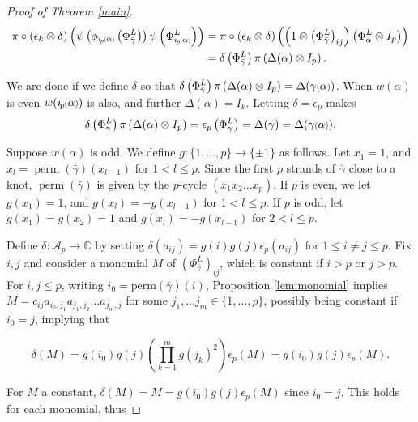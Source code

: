 \documentclass[11pt]{amsart}
\def\C{{\mathbb C}}
\def\A{{\mathcal A}}
\newcommand*{\smallp}[1]{\scalebox{.75}{\ensuremath#1}}
\newcommand*{\subsmallp}[1]{\scalebox{.5}{\ensuremath#1}}
\newcommand{\pp}[2][p]{\imath_{\hspace*{-1pt}#1}\hspace*{-.5pt}\smallp(#2\smallp)}
\newcommand{\subpp}[2][p]{\imath_{\hspace*{-1pt}#1}\hspace*{-.5pt}\subsmallp(#2\subsmallp)}
\newcommand\perm{\operatorname{perm}}
\theoremstyle{definition}
\begin{document}
\begin{proof}[Proof of Theorem \ref{main}]
\begin{align*}
\pi\circ(\epsilon_k\otimes\delta)\left(\psi\left(\phi_{\subpp\alpha}\left(\Phi_{\bar\gamma}^L\right)\right)\psi\left(\Phi_{\subpp\alpha}^L\right)\right)
    & = \pi\circ(\epsilon_k\otimes\delta)\left(\left(1\otimes \left(\Phi_{\bar\gamma}^L\right)_{ij}\right)\left(\Phi_\alpha^L\otimes I_p\right)\right)\\
    & = \delta\left(\Phi_{\bar\gamma}^L\right)\pi\left(\Delta(\alpha)\otimes I_p\right).
\end{align*}

We are done if we define $\delta$ so that $\delta\left(\Phi_{\bar\gamma}^L\right)\pi\left(\Delta(\alpha)\otimes I_p\right) = \Delta(\gamma\smallp(\alpha\smallp))$.  When $w(\alpha)$ is even $w(\pp\alpha)$ is also, and further $\Delta(\alpha)=I_k$. Letting $\delta = \epsilon_p$ makes 
\begin{equation*}
\delta\left(\Phi_{\bar\gamma}^L\right)\pi\left(\Delta(\alpha)\otimes I_p\right) = \epsilon_p\left(\Phi_{\bar\gamma}^L\right) = \Delta(\bar\gamma) = \Delta(\gamma\smallp(\alpha\smallp)).
\end{equation*}

Suppose $w(\alpha)$ is odd. We define $g\colon \{1,\ldots,p\}\rightarrow \{\pm 1\}$ as follows. Let $x_1 = 1$, and $x_l = \perm(\bar\gamma)(x_{l-1})$ for $1<l\le p$. Since the first $p$ strands of $\bar\gamma$ close to a knot, $\perm(\bar\gamma)$ is given by the $p$-cycle $(x_1x_2\ldots x_p)$. If $p$ is even, we let $g(x_1) = 1$, and $g(x_l) = -g(x_{l-1})$ for $1<l\le p$. If $p$ is odd, let $g(x_1) = g(x_2) = 1$ and $g(x_l) = -g(x_{l-1})$ for $2<l\le p$.

 Define $\delta: \A_p\to \C$ by setting $\delta(a_{ij}) = g(i)g(j)\epsilon_p(a_{ij})$ for $1\le i\ne j\le p$. Fix $i,j$ and consider a monomial $M$ of $\left(\Phi_{\bar\gamma}^L\right)_{ij}$, which is constant if $i>p$ or $j>p$. For $i,j\le p$, writing $i_0=\text{perm}(\bar\gamma)(i)$, Proposition \ref{lem:monomial} implies $M=c_{ij}a_{i_0,j_1}a_{j_1,j_2}\ldots a_{j_m,j}$ for some $j_1,\ldots j_m\in \{1,\ldots,p\}$, possibly being constant if $i_0=j$, implying that 

$$\delta(M) = g(i_0)g(j)\left(\prod_{k=1}^m g(j_k)^2\right)\epsilon_p(M) = g(i_0)g(j)\epsilon_p(M).$$

\noindent For $M$ a constant, $\delta(M) = M = g(i_0)g(j)\epsilon_p(M)$ since $i_0=j$. This holds for each monomial, thus


\end{proof}
\end{document}
